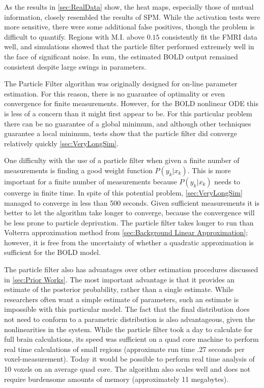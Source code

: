 \documentclass[journal]{./IEEEtran}
\begin{document}
As the results in \autoref{sec:RealData} show, the heat maps, especially
those of mutual information, closely resembled the results of SPM. While the activation
tests were more sensitive, there were some additional false positives,
though the problem is difficult to quantify. Regions with M.I. above
$0.15$ consistently fit the FMRI data well, and simulations showed that
the particle filter performed extremely well in the face of significant
noise. In sum, the estimated BOLD output remained consistent despite
large swings in parameters.

The Particle Filter algorithm was originally designed for on-line parameter
estimation. For this reason, there is no guarantee of optimality or even
convergence for finite measurements. However, for the BOLD nonlinear ODE
this is less of a concern than it might first appear to be. For this
particular problem there can be no guarantee of a global minimum, and although
other techniques guarantee a local minimum, tests show that the particle
filter did converge relatively quickly \autoref{sec:VeryLongSim}.

One difficulty with the use of a particle filter when given a finite number 
of measurements is finding
a good weight function $P(y_k | x_k)$. This is more important for a finite
number of measurements because $P(y_k | x_k)$ needs to converge in finite time.
In spite of this potential problem, \autoref{sec:VeryLongSim} managed
to converge in less than 500 seconds.  Given sufficient
measurements it is better to let the algorithm take longer to converge, because the
convergence will be less prone to particle deprivation. The particle filter takes longer
to run than Volterra approximation method from \autoref{sec:Background Linear Approximation};
however, it is free from the uncertainty of whether a quadratic approximation is
sufficient for the BOLD model.

The particle filter also has advantages over other estimation procedures
discussed in \autoref{sec:Prior Works}. The most important advantage is that it provides
an estimate of the posterior probability, rather than a single estimate. While researchers
often want a simple estimate of parameters, such an estimate is impossible with this particular
model. The fact that the final distribution does not need to conform to a
parametric distribution is also advantageous, given the nonlinearities in the system.
While the particle filter took a day to calculate for full brain calculations, its speed
was sufficient on a quad core machine to perform real time calculations of small regions
(approximate run time .27 seconds per voxel-measurement). Today it would be possible
 to perform real time analysis of 10 voxels on an average quad core. The algorithm also scales
well and does not require burdensome amounts of memory (approximately 11 megabytes).
\end{document}
